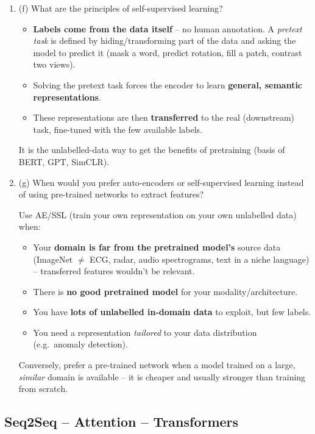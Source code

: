\documentclass[10pt,a4paper]{article}
\newcommand{\q}[1]{\item #1}
\begin{document}
\begin{enumerate}[leftmargin=*,label=\textbf{Q\arabic*.}]
\q (f) What are the principles of self-supervised learning?
\begin{answerbox}
\begin{itemize}[leftmargin=1.2em]
  \item \textbf{Labels come from the data itself} -- no human annotation. A \emph{pretext task} is defined by hiding/transforming part of the data and asking the model to predict it (mask a word, predict rotation, fill a patch, contrast two views).
  \item Solving the pretext task forces the encoder to learn \textbf{general, semantic representations}.
  \item These representations are then \textbf{transferred} to the real (downstream) task, fine-tuned with the few available labels.
\end{itemize}
It is the unlabelled-data way to get the benefits of pretraining (basis of BERT, GPT, SimCLR).
\end{answerbox}

\q (g) When would you prefer auto-encoders or self-supervised learning instead of using pre-trained networks to extract features?
\begin{answerbox}
Use AE/SSL (train your own representation on your own unlabelled data) when:
\begin{itemize}[leftmargin=1.2em]
  \item Your \textbf{domain is far from the pretrained model's} source data (ImageNet $\neq$ ECG, radar, audio spectrograms, text in a niche language) -- transferred features wouldn't be relevant.
  \item There is \textbf{no good pretrained model} for your modality/architecture.
  \item You have \textbf{lots of unlabelled in-domain data} to exploit, but few labels.
  \item You need a representation \emph{tailored} to your data distribution (e.g.\ anomaly detection).
\end{itemize}
Conversely, prefer a pre-trained network when a model trained on a large, \emph{similar} domain is available -- it is cheaper and usually stronger than training from scratch.
\end{answerbox}

\end{enumerate}

\subsection{Seq2Seq -- Attention -- Transformers}
\end{document}
